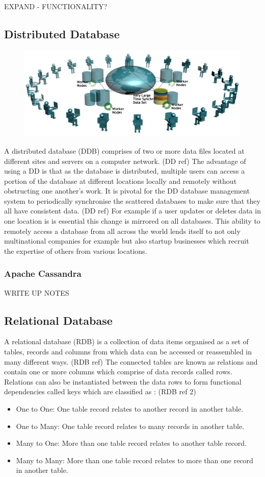 EXPAND - FUNCTIONALITY? 

\subsection{Distributed Database}
\begin{figure}\includegraphics[width=0.9\linewidth]{images/ddelogo}\end{figure} A distributed database (DDB) comprises of two or more data files located at different sites and servers on a computer network. (DD ref) The advantage of using a DD is that as the database is distributed, multiple users can access a portion of the database at different locations locally and remotely without obstructing one another's work. It is  pivotal for the DD database management system to periodically synchronise the scattered databases to make sure that they all have consistent data. (DD ref) For example if a user updates or deletes data in one location is is essential this change is mirrored on all databases. This ability to remotely access a database from all across the world lends itself to not only multinational companies for example but also startup businesses which recruit the expertise of others from various locations.

\subsubsection{Apache Cassandra}\label{cassandra}
WRITE UP NOTES
\subsection{Relational Database}
A relational database (RDB) is a collection of data items organised as a set of tables, records and columns from which data can be accessed or reassembled in many different ways. (RDB ref) The connected tables are known as relations and contain one or more columns which comprise of data records called rows. Relations can also be instantiated between the data rows to form functional dependencies called keys which are classified as : (RDB ref 2)
\begin{itemize}
\item One to One: One table record relates to another record in another table.
\item One to Many: One table record relates to many records in another table.
\item Many to One: More than one table record relates to another table record.
\item Many to Many: More than one table record relates to more than one record in another table.
\end{itemize} 
